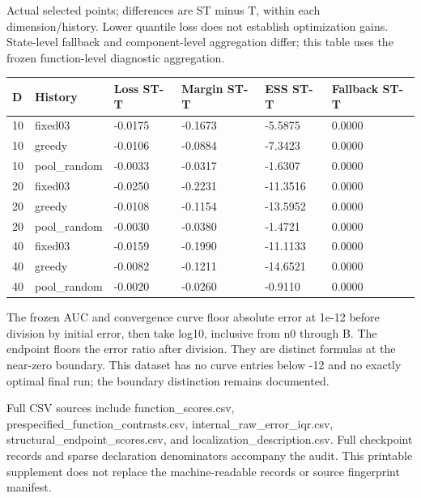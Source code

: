 \documentclass[11pt,a4paper]{article}
\begin{document}
Actual selected points; differences are ST minus T, within each
dimension/history. Lower quantile loss does not establish optimization
gains. State-level fallback and component-level aggregation differ; this
table uses the frozen function-level diagnostic aggregation.

\par\noindent\begin{minipage}{\linewidth}

\begin{longtable}[]{@{}llllll@{}}
\toprule
D & History & Loss ST-T & Margin ST-T & ESS ST-T & Fallback ST-T \\
\midrule
\endhead
10 & fixed03 & -0.0175 & -0.1673 & -5.5875 & 0.0000 \\
10 & greedy & -0.0106 & -0.0884 & -7.3423 & 0.0000 \\
10 & pool\_random & -0.0033 & -0.0317 & -1.6307 & 0.0000 \\
20 & fixed03 & -0.0250 & -0.2231 & -11.3516 & 0.0000 \\
20 & greedy & -0.0108 & -0.1154 & -13.5952 & 0.0000 \\
20 & pool\_random & -0.0030 & -0.0380 & -1.4721 & 0.0000 \\
40 & fixed03 & -0.0159 & -0.1990 & -11.1133 & 0.0000 \\
40 & greedy & -0.0082 & -0.1211 & -14.6521 & 0.0000 \\
40 & pool\_random & -0.0020 & -0.0260 & -0.9110 & 0.0000 \\
\bottomrule
\end{longtable}

\end{minipage}\par

The frozen AUC and convergence curve floor absolute error at 1e-12
before division by initial error, then take log10, inclusive from n0
through B. The endpoint floors the error ratio after division. They are
distinct formulas at the near-zero boundary. This dataset has no curve
entries below -12 and no exactly optimal final run; the boundary
distinction remains documented.

Full CSV sources include function\_scores.csv,
prespecified\_function\_contrasts.csv, internal\_raw\_error\_iqr.csv,
structural\_endpoint\_scores.csv, and localization\_description.csv.
Full checkpoint records and sparse declaration denominators accompany
the audit. This printable supplement does not replace the
machine-readable records or source fingerprint manifest.
\end{document}
